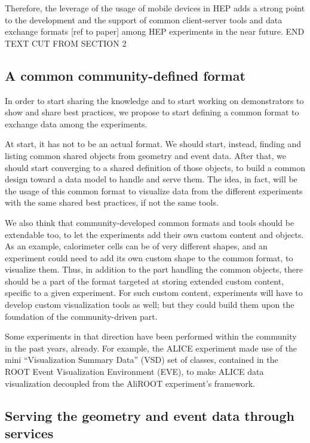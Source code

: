 \documentclass[12pt,a4paper]{article}
\begin{document}
Therefore, the leverage of the usage of mobile devices in HEP adds a strong point to the development and the support of common
client-server tools and data exchange formats [ref to paper] among HEP experiments in the near future.
END TEXT CUT FROM SECTION 2

\hypertarget{common-format}{%
\subsection{A common community-defined format}\label{common-format}}

In order to start sharing the knowledge and to start working on demonstrators to show and share best practices, we propose to
start defining a common format to exchange data among the experiments.

At start, it has not to be an actual format. We should start, instead, finding and listing common shared objects from geometry
and event data. After that, we should start converging to a shared definition of those objects, to build a common design toward
a data model to handle and serve them. The idea, in fact, will be the usage of this common format to visualize data from the
different experiments with the same shared best practices, if not the same tools.

We also think that community-developed common formats and tools should be extendable too, to let the experiments add their own
custom content and objects. As an example, calorimeter cells can be of very different shapes, and an experiment could need to
add its own custom shape to the common format, to visualize them. Thus, in addition to the part handling the common objects,
there should be a part of the format targeted at storing extended custom content, specific to a given experiment. For such
custom content, experiments will have to develop custom visualization tools as well; but they could build them upon the foundation
of the community-driven part.

Some experiments in that direction have been performed within the community in the past years, already. For example,
the ALICE experiment made use of the mini “Visualization Summary Data” (VSD) set of classes, contained in the ROOT Event
Visualization Environment (EVE), to make ALICE data visualization decoupled from the AliROOT experiment’s framework.

\hypertarget{serving-data}{%
\subsection{Serving the geometry and event data through services}\label{serving-data}}
\end{document}
